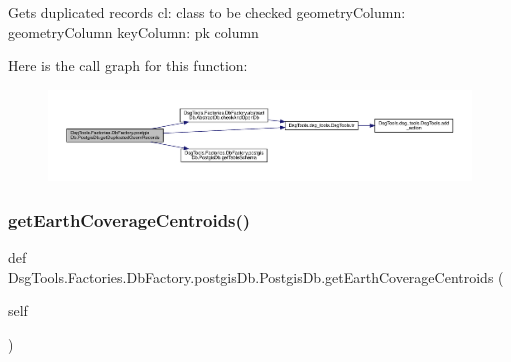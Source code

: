 \begin{DoxyVerb}Gets duplicated records
cl: class to be checked
geometryColumn: geometryColumn
keyColumn: pk column
\end{DoxyVerb}
 Here is the call graph for this function\+:
\nopagebreak
\begin{figure}[H]
\begin{center}
\leavevmode
\includegraphics[width=350pt]{class_dsg_tools_1_1_factories_1_1_db_factory_1_1postgis_db_1_1_postgis_db_a38b56f5d9cb251ec95560f2204a95779_cgraph}
\end{center}
\end{figure}
\mbox{\label{class_dsg_tools_1_1_factories_1_1_db_factory_1_1postgis_db_1_1_postgis_db_a79250fa15afdb832f3cccc0abc556a6e}} 
\subsubsection{\texorpdfstring{get\+Earth\+Coverage\+Centroids()}{getEarthCoverageCentroids()}}
{\footnotesize\ttfamily def Dsg\+Tools.\+Factories.\+Db\+Factory.\+postgis\+Db.\+Postgis\+Db.\+get\+Earth\+Coverage\+Centroids (\begin{DoxyParamCaption}\item[{}]{self }\end{DoxyParamCaption})}

